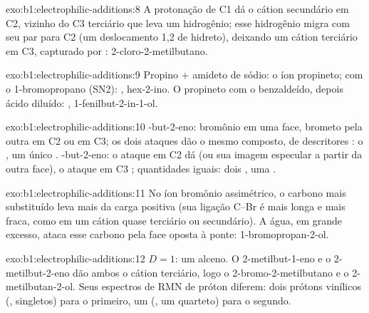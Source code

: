 \begin{solution}{exo:b1:electrophilic-additions:8}
A protonação de C1 dá o cátion secundário em C2, vizinho do C3 terciário
que leva um hidrogênio; esse hidrogênio migra com seu par para C2 (um
deslocamento 1,2 de hidreto), deixando um cátion terciário em C3,
capturado por : 2-cloro-2-metilbutano.
\end{solution}

\begin{solution}{exo:b1:electrophilic-additions:9}
Propino + amideto de sódio: o íon propineto; com o 1-bromopropano (SN2):
, hex-2-ino. O propineto com o benzaldeído, depois
ácido diluído: , 1-fenilbut-2-in-1-ol.
\end{solution}

\begin{solution}{exo:b1:electrophilic-additions:10}
-but-2-eno: bromônio em uma face, brometo pela outra em C2 ou em
C3; os dois ataques dão o mesmo composto, de descritores : o
, um único . -but-2-eno: o ataque em C2
dá  (ou sua imagem especular a partir da outra face), o ataque
em C3 ; quantidades iguais: dois , uma .
\end{solution}

\begin{solution}{exo:b1:electrophilic-additions:11}
No íon bromônio assimétrico, o carbono mais substituído leva mais da
carga positiva (sua ligação C--Br é mais longa e mais fraca, como em um
cátion quase terciário ou secundário). A água, em grande excesso, ataca
esse carbono pela face oposta à ponte: 1-bromopropan-2-ol.
\end{solution}

\begin{solution}{exo:b1:electrophilic-additions:12}
$D = 1$: um alceno. O 2-metilbut-1-eno e o 2-metilbut-2-eno dão ambos o
cátion terciário, logo o 2-bromo-2-metilbutano e o 2-metilbutan-2-ol. Seus
espectros de RMN de próton diferem: dois prótons vinílicos (,
singletos) para o primeiro, um (, um quarteto) para o segundo.
\end{solution}

